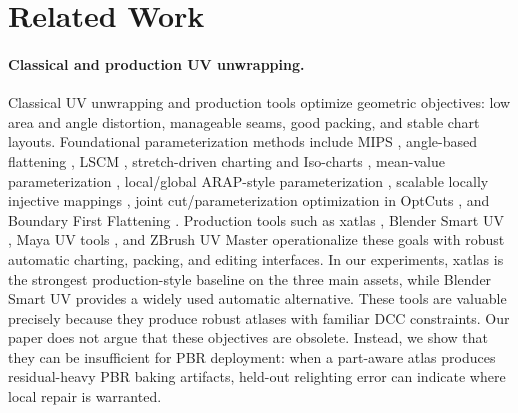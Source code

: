 \section{Related Work}
\label{sec:related}

\paragraph*{Classical and production UV unwrapping.}
Classical UV unwrapping and production tools optimize geometric objectives: low area and angle distortion, manageable seams, good packing, and stable chart layouts. Foundational parameterization methods include MIPS \cite{hormann2000_mips_efficient_global_parameterization}, angle-based flattening \cite{sheffer2001_abf_parameterization}, LSCM \cite{levy2002_lscm_texture_atlas}, stretch-driven charting and Iso-charts \cite{sander2001_texture_mapping_progressive_meshes,zhou2004_iso_charts}, mean-value parameterization \cite{floater1997_parametrization_smooth_approximation}, local/global ARAP-style parameterization \cite{liu2008_local_global_parameterization}, scalable locally injective mappings \cite{rabinovich2017_scalable_locally_injective}, joint cut/parameterization optimization in OptCuts \cite{li2018_optcuts}, and Boundary First Flattening \cite{sawhney2017_boundary_first_flattening}. Production tools such as xatlas \cite{young2024_xatlas}, Blender Smart UV \cite{blender2026_smart_uv_project}, Maya UV tools \cite{autodesk2026_maya_uv_editor}, and ZBrush UV Master \cite{maxon2026_zbrush_uv_master} operationalize these goals with robust automatic charting, packing, and editing interfaces. In our experiments, xatlas is the strongest production-style baseline on the three main assets, while Blender Smart UV provides a widely used automatic alternative. These tools are valuable precisely because they produce robust atlases with familiar DCC constraints. Our paper does not argue that these objectives are obsolete. Instead, we show that they can be insufficient for PBR deployment: when a part-aware atlas produces residual-heavy PBR baking artifacts, held-out relighting error can indicate where local repair is warranted.

